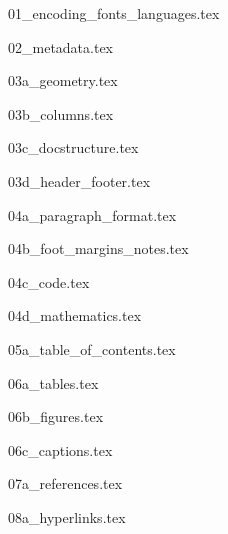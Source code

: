 

{01_encoding_fonts_languages.tex}


{02_metadata.tex}


{03a_geometry.tex}

{03b_columns.tex}

{03c_docstructure.tex}

{03d_header_footer.tex}

{04a_paragraph_format.tex}

{04b_foot_margins_notes.tex}

{04c_code.tex}

{04d_mathematics.tex}


{05a_table_of_contents.tex}


{06a_tables.tex}

{06b_figures.tex}

{06c_captions.tex}

{07a_references.tex}

{08a_hyperlinks.tex}
